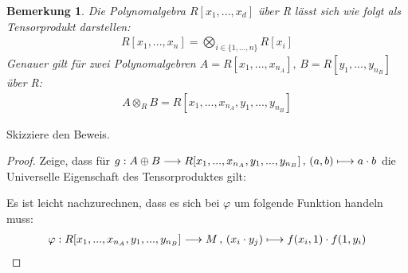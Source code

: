\documentclass[10pt,a4paper]{report}
\newcounter{Aussage}[chapter]
\newtheorem{bem}[Aussage]{Bemerkung}
\newcommand{\function}[5]{\nolinebreak{#1:#2 \longrightarrow #3 \, , \, #4 \longmapsto #5}}
\newcommand{\Tensor}[3]{#1 \otimes_{#2} #3}
\begin{document}
\begin{bem}\label{Darstellung der Polynomalgebra als Tensorprodukt}
Die Polynomalgebra $R[x_1,...,x_d]$ über R lässt sich wie folgt als Tensorprodukt darstellen:
\begin{gather*}
R[x_1,...,x_n] = \bigotimes_{i \in \lbrace 1,...,n \rbrace} R[x_i]
\end{gather*}
Genauer gilt für zwei Polynomalgebren $A = R[x_1,...,x_{n_A}], \, B = R[y_1,...,y_{n_B}]$ über R:
\begin{gather*}
\Tensor{A}{R}{B}  = R[x_1,...,x_{n_A},y_1,...,y_{n_B}]
\end{gather*}
\end{bem}
Skizziere den Beweis.
\begin{proof}
Zeige, dass für $\function{g}{A \oplus B}{R[x_1,...,x_{n_A},y_1,...,y_{n_B}]}{(a,b)}{a \cdot b}$ die Universelle Eigenschaft des Tensorproduktes gilt:
\begin{center}
\end{center}
Es ist leicht nachzurechnen, dass es sich bei $\varphi$ um folgende Funktion handeln muss:
\begin{gather*}
\function{\varphi}{R[x_1,...,x_{n_A},y_1,...,y_{n_B}]}{M}{(x_i \cdot y_j)}{f(x_i,1) \cdot f(1,y_i)}
\end{gather*}
\end{proof}
\end{document}
